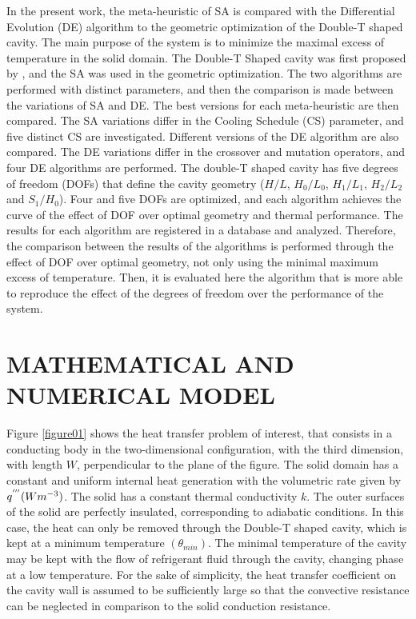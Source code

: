 \documentclass[12pt,fleqn]{article}
\begin{document}
In the present work, the meta-heuristic of SA is compared with the Differential Evolution (DE) algorithm to the geometric optimization of the Double-T shaped cavity. The main purpose of the system is to minimize the maximal excess of temperature in the solid domain. The Double-T Shaped cavity was first proposed by \cite{Gonzales2015b}, and the SA was used in the geometric optimization. The two algorithms are performed with distinct parameters, and then the comparison is made between the variations of SA and DE. The best versions for each meta-heuristic are then compared. The SA variations differ in the Cooling Schedule (CS) parameter, and five distinct CS are investigated. Different versions of the DE algorithm are also compared. The DE variations differ in the crossover and mutation operators, and four DE algorithms are performed. The double-T shaped cavity has five degrees of freedom (DOFs) that define the cavity geometry ($H/L$, $H_{0}/L_{0}$, $H_{1}/L_{1}$, $H_{2}/L_{2}$ and $S_{1}/H_{0}$). Four and five DOFs are optimized, and each algorithm achieves the curve of the effect of DOF over optimal geometry and thermal performance. The results for each algorithm are registered in a database and analyzed. Therefore, the comparison between the results of the algorithms is performed through the effect of DOF over optimal geometry, not only using the minimal maximum excess of temperature.  Then, it is evaluated here the algorithm that is more able to reproduce the effect of the degrees of freedom over the performance of the system.

\section{MATHEMATICAL AND NUMERICAL MODEL}


Figure \ref{figure01} shows the heat transfer problem of interest, that consists in a conducting body in the two-dimensional configuration, with the third dimension, with length $W$, perpendicular to the plane of the figure. The solid domain has a constant and uniform internal heat generation with the volumetric rate given by $q^{'''}(Wm^{\tiny -3})$. The solid has a constant thermal conductivity $k$. The outer surfaces of the solid are perfectly insulated, corresponding to adiabatic conditions. In this case, the heat can only be removed through the Double-T shaped cavity, which is kept at a minimum temperature $(\theta_{min})$. The minimal temperature of the cavity may be kept with the flow of refrigerant fluid through the cavity, changing phase at a low temperature. For the sake of simplicity, the heat transfer coefficient on the cavity wall is assumed to be sufficiently large so that the convective resistance can be neglected in comparison to the solid conduction resistance.
\end{document}
